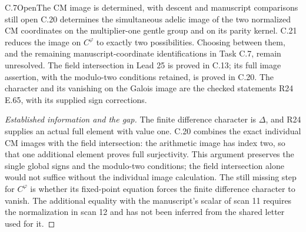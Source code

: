 \begin{statement}{C.7}{Open}{The CM image is determined, with descent and manuscript comparisons still open}
C.20 determines the simultaneous adelic image of the two
normalized CM coordinates on the multiplier-one gentle group
and on its parity kernel. C.21 reduces the image on
$C^\varphi$ to exactly two possibilities. Choosing between
them, and the remaining manuscript-coordinate identifications
in Task C.7, remain unresolved. The field intersection in
Lead 25 is proved in C.13; its full image assertion, with
the modulo-two conditions retained, is proved in C.20.
The character and its vanishing on the Galois image are
the checked statements R24 E.65, with its supplied sign corrections.
\end{statement}
\begin{proof}[Established information and the gap]
The finite difference character is $\Delta$, and R24
supplies an actual full element with value one. C.20
combines the exact individual CM images with the field
intersection: the arithmetic image has index two, so
that one additional element proves full surjectivity.
This argument preserves the single global signs and
the modulo-two conditions; the field intersection
alone would not suffice without the individual image
calculation. The still missing step for $C^\varphi$
is whether its fixed-point equation forces the finite
difference character to vanish. The additional equality with the
manuscript's scalar of scan 11 requires the normalization in scan 12
and has not been inferred from the shared letter used for it.
\end{proof}

